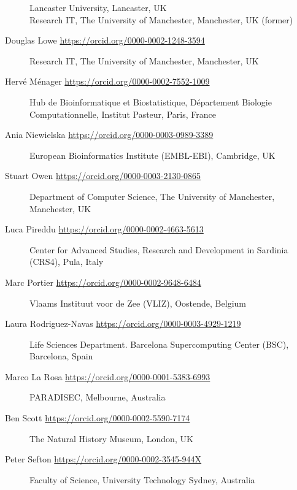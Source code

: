 \begin{description}
Lancaster University, Lancaster, UK\\
Research IT, The University of Manchester, Manchester, UK (former)
\item[Douglas Lowe \url{https://orcid.org/0000-0002-1248-3594}]
Research IT, The University of Manchester, Manchester, UK
\item[Hervé Ménager \url{https://orcid.org/0000-0002-7552-1009}]
Hub de Bioinformatique et Biostatistique, Département Biologie
Computationnelle, Institut Pasteur, Paris, France
\item[Ania Niewielska \url{https://orcid.org/0000-0003-0989-3389}]
European Bioinformatics Institute (EMBL-EBI), Cambridge, UK
\item[Stuart Owen \url{https://orcid.org/0000-0003-2130-0865}]
Department of Computer Science, The University of Manchester,
Manchester, UK
\item[Luca Pireddu \url{https://orcid.org/0000-0002-4663-5613}]
Center for Advanced Studies, Research and Development in Sardinia
(CRS4), Pula, Italy
\item[Marc Portier \url{https://orcid.org/0000-0002-9648-6484}]
Vlaams Instituut voor de Zee (VLIZ), Oostende, Belgium
\item[Laura Rodriguez-Navas \url{https://orcid.org/0000-0003-4929-1219}]
Life Sciences Department. Barcelona Supercomputing Center (BSC),
Barcelona, Spain
\item[Marco La Rosa \url{https://orcid.org/0000-0001-5383-6993}]
PARADISEC, Melbourne, Australia
\item[Ben Scott \url{https://orcid.org/0000-0002-5590-7174}]
The Natural History Museum, London, UK
\item[Peter Sefton \url{https://orcid.org/0000-0002-3545-944X}]
Faculty of Science, University Technology Sydney, Australia


\end{description}
